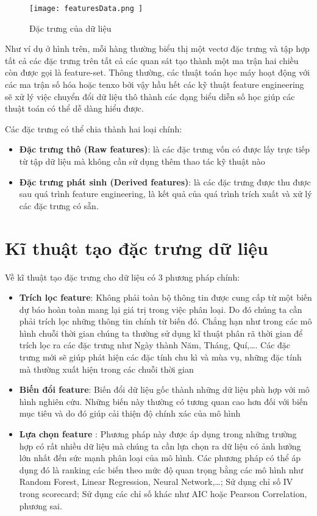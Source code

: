 \begin{figure}[h!]
	\centering
	\texttt{[image: 
		featuresData.png
	]}
	\caption[Đặc trưng của dữ liệu]{
		Đặc trưng của dữ liệu \label{pic2.2}
	}
\end{figure}

Như ví dụ ở hình trên, mỗi hàng thường biểu thị một vectơ đặc trưng và tập hợp tất cả các đặc trưng trên tất cả các quan sát tạo thành một ma trận hai chiều còn được gọi là feature-set. Thông thường, các thuật toán học máy hoạt động với các ma trận số hóa hoặc tenxo bởi vậy hầu hết các kỹ thuật feature engineering sẽ xử lý việc chuyển đổi dữ liệu thô thành các dạng biểu diễn số học giúp các thuật toán có thể dễ dàng hiểu được.

Các đặc trưng có thể chia thành hai loại chính:

\begin{itemize}
	\item \textbf{Đặc trưng thô (Raw features)}: là các đặc trưng vốn có được lấy trực tiếp từ tập dữ liệu mà không cần sử dụng thêm thao tác kỹ thuật nào
	\item \textbf{Đặc trưng phát sinh (Derived features)}: là các đặc trưng được thu được sau quá trình feature engineering, là kết quả của quá trình trích xuất và xử lý các đặc trưng có sẵn. 
\end{itemize}

\section{Kĩ thuật tạo đặc trưng dữ liệu}

Về kĩ thuật tạo đặc trưng cho dữ liệu có 3 phương pháp chính:
\begin{itemize}
	\item \textbf{Trích lọc feature}: Không phải toàn bộ thông tin được cung cấp từ một biến dự báo hoàn toàn mang lại giá trị trong việc phân loại. Do đó chúng ta cần phải trích lọc những thông tin chính từ biến đó. Chẳng hạn như trong các mô hình chuỗi thời gian chúng ta thường sử dụng kĩ thuật phân rã thời gian để trích lọc ra các đặc trưng như Ngày thành Năm, Tháng, Quí,…. Các đặc trưng mới sẽ giúp phát hiện các đặc tính chu kì và mùa vụ, những đặc tính mà thường xuất hiện trong các chuỗi thời gian
	\item \textbf{Biến đổi feature}:  Biến đổi dữ liệu gốc thành những dữ liệu phù hợp với mô hình nghiên cứu. Những biến này thường có tương quan cao hơn đối với biến mục tiêu và do đó giúp cải thiện độ chính xác của mô hình
	\item \textbf{Lựa chọn feature} : Phương pháp này được áp dụng trong những trường hợp có rất nhiều dữ liệu mà chúng ta cần lựa chọn ra dữ liệu có ảnh hưởng lớn nhất đến sức mạnh phân loại của mô hình. Các phương pháp có thể áp dụng đó là ranking các biến theo mức độ quan trọng bằng các mô hình như Random Forest, Linear Regression, Neural Network,…; Sử dụng chỉ số IV trong scorecard; Sử dụng các chỉ số khác như AIC hoặc Pearson Correlation, phương sai.
\end{itemize}

